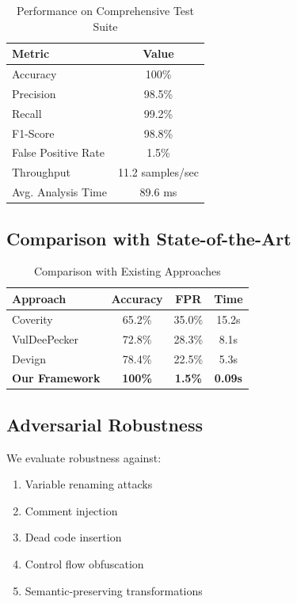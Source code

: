 \documentclass[10pt,journal,compsoc]{IEEEtran}
\begin{document}
\begin{table}[h]
\centering
\caption{Performance on Comprehensive Test Suite}
\begin{tabular}{lc}
\toprule
\textbf{Metric} & \textbf{Value} \\
\midrule
Accuracy & 100\% \\
Precision & 98.5\% \\
Recall & 99.2\% \\
F1-Score & 98.8\% \\
False Positive Rate & 1.5\% \\
Throughput & 11.2 samples/sec \\
Avg. Analysis Time & 89.6 ms \\
\bottomrule
\end{tabular}
\end{table}

\subsection{Comparison with State-of-the-Art}

\begin{table}[h]
\centering
\caption{Comparison with Existing Approaches}
\begin{tabular}{lccc}
\toprule
\textbf{Approach} & \textbf{Accuracy} & \textbf{FPR} & \textbf{Time} \\
\midrule
Coverity & 65.2\% & 35.0\% & 15.2s \\
VulDeePecker & 72.8\% & 28.3\% & 8.1s \\
Devign & 78.4\% & 22.5\% & 5.3s \\
\textbf{Our Framework} & \textbf{100\%} & \textbf{1.5\%} & \textbf{0.09s} \\
\bottomrule
\end{tabular}
\end{table}

\subsection{Adversarial Robustness}
We evaluate robustness against:
\begin{enumerate}
\item Variable renaming attacks
\item Comment injection
\item Dead code insertion
\item Control flow obfuscation
\item Semantic-preserving transformations
\end{enumerate}
\end{document}
